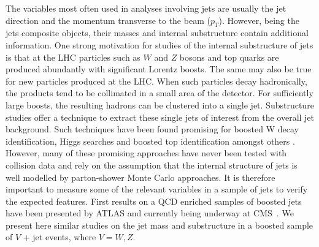  The variables most often used in analyses involving jets are usually the jet direction and the momentum transverse to the beam ($p_T$). 
However, being  the jets composite objects, their masses and internal substructure contain additional information.
One strong motivation for studies of the internal substructure of jets is that at the LHC particles such as $W$ and $Z$ bosons and top quarks are produced abundantly with significant Lorentz boosts. The same may also be true for new particles produced at the LHC. When
 such particles decay hadronically, the products tend to be collimated in a small area of the detector. For sufficiently large boosts, the resulting hadrons can be clustered into a single jet. Substructure studies offer a technique to extract these single jets of interest from the overall jet background. Such techniques have been found promising for boosted W decay identification, Higgs searches and boosted top identification amongst others \cite{jetsub}. However, many of these promising approaches have never been tested with collision data and rely on the assumption that the internal structure of jets is well modelled by parton-shower Monte Carlo approaches. It is therefore important to measure some of the relevant variables in a sample of jets to verify the expected features. First results on a QCD enriched samples of boosted jets have been presented by ATLAS \cite{atlasJS} and currently being underway at CMS~\cite{CMSJS}. We present here similar studies on the jet mass and substructure in a boosted sample of $V$ + jet events, where $V=W, Z$. 
